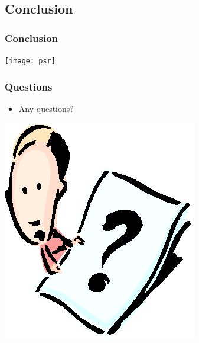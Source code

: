 \documentclass[CJKutf8,xcolor=pdftex,dvipsnames,table]{beamer}
\begin{document}
\begin{CJK*}{UTF8}{song}
\section{Conclusion}

  \begin{frame}
  \frametitle{Conclusion}
  \begin{center}
	\texttt{[image: psr]}
  \end{center}
  \end{frame}

  \begin{frame}
  \frametitle{Questions}
  \begin{itemize}
	\item{Any questions?}
  \end{itemize}
  \begin{center}
	\includegraphics[scale=.5]{question}
  \end{center}
  \end{frame}

\end{CJK*}
\end{document}
